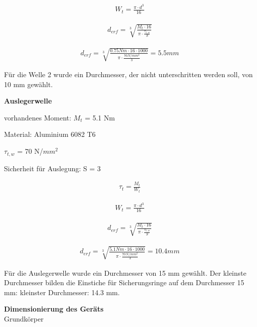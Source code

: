 \begin{align*}
W_{t} = \frac{\pi \cdot d^{3}}{16}
\end{align*}

\begin{align*}
d_{erf} = \sqrt[3]{\frac{M_{t} \cdot 16}{\pi \cdot \frac{\tau_{t,w}}{S}}} 
\end{align*}

\begin{align*}
d_{erf} = \sqrt[3]{\frac{0.75 Nm \cdot 16 \cdot 1000}{\pi \cdot \frac{70 N/mm^{2}}{3}}} = 5.5 mm
\end{align*}

Für die Welle 2 wurde ein Durchmesser, der nicht unterschritten werden soll, von 10 mm gewählt.

\newpage








\textbf{Auslegerwelle}

vorhandenes Moment: $M_{t}$ = 5.1 Nm

Material: Aluminium 6082 T6

$\tau_{t,w}$ = 70 N/$mm^{2}$

Sicherheit für Auslegung: S = 3

\begin{align*}
\tau_{t} = \frac{M_{t}}{W_{t}}
\end{align*}

\begin{align*}
W_{t} = \frac{\pi \cdot d^{3}}{16}
\end{align*}

\begin{align*}
d_{erf} = \sqrt[3]{\frac{M_{t} \cdot 16}{\pi \cdot \frac{\tau_{t,w}}{S}}} 
\end{align*}

\begin{align*}
d_{erf} = \sqrt[3]{\frac{5.1 Nm \cdot 16 \cdot 1000}{\pi \cdot \frac{70 N/mm^{2}}{3}}} = 10.4 mm
\end{align*}

Für die Auslegerwelle wurde ein Durchmesser von 15 mm gewählt. Der kleinste Durchmesser bilden die Einstiche für Sicherungsringe auf dem Durchmesser 15 mm: kleinster Durchmesser: 14.3 mm.

\newpage

\textbf{Dimensionierung des Geräts}\\

Grundkörper\\

